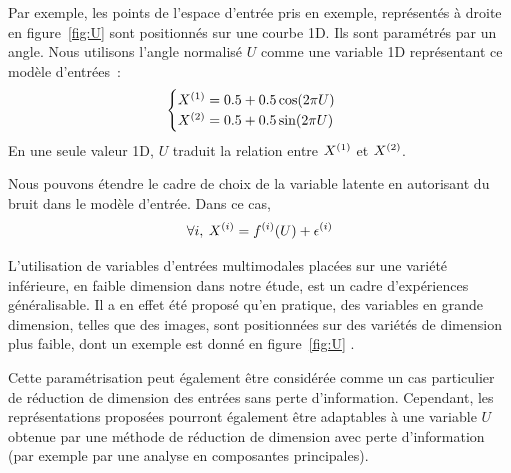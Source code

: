 \documentclass[../main]{subfiles}
\begin{document}
Par exemple, les points de l'espace d'entrée pris en exemple, représentés à droite en figure~\ref{fig:U} sont positionnés sur une courbe 1D. Ils sont paramétrés par un angle.
Nous utilisons l'angle normalisé $U$ comme une variable 1D représentant ce modèle d'entrées~:
\begin{equation}
 \begin{cases}
     X^{({1})}= 0.5 + 0.5  \cos(2\pi U)\\
     X^{({2})} = 0.5 + 0.5 \sin(2 \pi U)
    \end{cases}\,
\end{equation}
En une seule valeur 1D, $U$ traduit la relation entre $X^{({1})}$ et $X^{({2})}$.

Nous pouvons étendre le cadre de choix de la variable latente en autorisant du bruit dans le modèle d'entrée.
Dans ce cas, 
\begin{equation}
    \forall i, \: X^{({i})} = f^{({i})}(U) + \epsilon^{({i})}
\end{equation}

L'utilisation de variables d'entrées multimodales placées sur une variété inférieure, en faible dimension dans notre étude, est un cadre d'expériences généralisable. 
Il a en effet été proposé qu'en pratique, des variables en grande dimension, telles que des images, sont positionnées sur des variétés de dimension plus faible, dont un exemple est donné en figure~\ref{fig:U} \cite{Pless2009ASO}.

Cette paramétrisation peut également être considérée comme un cas particulier de réduction de dimension des entrées sans perte d'information.
Cependant, les représentations proposées pourront également être adaptables à une variable $U$ obtenue par une méthode de réduction de dimension avec perte d'information (par exemple par une analyse en composantes principales).
\end{document}
